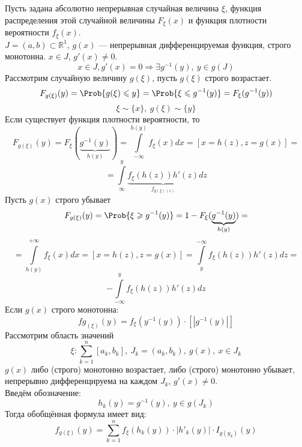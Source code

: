 Пусть задана абсолютно непрерывная случайная величина $\xi$, функция распределения этой случайной величины $F_{\xi} (x) $ и функция плотности вероятности $ f_{\xi} (x) $. \\
$ J = (a, b) \subset \mathbb{R}^1$, $g(x)$ --- непрерывная дифференцируемая функция, строго монотонна. $x \in J$, $g'(x) \neq 0$. 
\[
	x \in J, g'(x) = 0 \Rightarrow \exists g^{-1} (y), \ y \in g(J)
\] 
Рассмотрим случайную величину $g(\xi)$, пусть $g(\xi)$ строго возрастает.
\[
	F_{g(\xi)}(y) = \Prob \{ g(\xi) \leqslant y \} = \Prob \{ \xi \leqslant g^{-1}(y) \} = F_{\xi} (g^{-1}(y))
\]
\[
	\xi \sim \{ x \}, \ g(\xi) \sim \{ y \}
\]
Если существует функция плотности вероятности, то
\[
	F_{g(\xi)} (y) = F_{\xi} (\underbrace{g^{-1}(y)}_{h(y)}) = \int\limits_{-\infty}^{h(y)} f_{\xi} (x) dx = [x = h(z), z = g(x)] = 
\]
\[
	= \int\limits_{\infty}^{y} \underbrace{f_{\xi} (h(z)) h'(z)}_{f_{g(\xi) (z)}} dz
\]
Пусть $g(x)$ строго убывает
\[
	F_{g(\xi)} (y) = \Prob \{ \xi \geqslant g^{-1}(y) \} = 1 - F_{\xi} (\underbrace{g^{-1}(y)}_{h(y)}) = 
\]
\[
	= \int\limits_{h(y)}^{+\infty} f_{\xi} (x) dx = [ x = h(z), z = g(x) ] = \int\limits_{y}^{-\infty} f_{\xi} (h(z)) h'(z) dz =
\]
\[
	- \int\limits_{-\infty}^y f_{\xi} (h(z)) h'(z) dz
\]
Если $g(x)$ строго монотонна:
\[
	fg_{(\xi)} (y) = f_{\xi} (y^{-1}(y)) \cdot [|g^{-1}(y)|]
\]
Рассмотрим область значений
\[
	\xi : \sum\limits_{k = 1}^{n} [a_k, b_k], \ J_k = (a_k, b_k), \ g(x), \ x \in J_k
\]
$g(x)$ либо (строго) монотонно возрастает, либо (строго) монотонно убывает, непрерывно дифференцируема на каждом $J_k$, $g'(x) \neq 0$. \\
Введём обозначение:
\[
	h_k(y) = g^{-1}(y), \ y \in g(J_k)
\]
Тогда обобщённая формула имеет вид:
\[
	f_{g(\xi)} (y) = \sum\limits_{k = 1}^{n} f_{\xi} (h_k(y)) \cdot | {h'}_k(y) | \cdot I_{g(y_k)} (y)
\]

